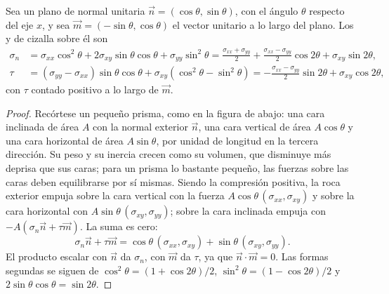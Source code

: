 \begin{proposition}\label{prop:b1:stress-strain-rheology:transformation}
Sea un plano de normal unitaria $\vec n = (\cos\theta, \sin\theta)$, con el ángulo $\theta$ respecto del eje $x$, y sea $\vec m = (-\sin\theta, \cos\theta)$ el vector
unitario a lo largo del plano. Los  y de cizalla sobre él son
\begin{align*}
  \sigma_n &= \sigma_{xx}\cos^2\theta + 2\sigma_{xy}\sin\theta\cos\theta + \sigma_{yy}\sin^2\theta
           = \frac{\sigma_{xx}+\sigma_{yy}}{2} + \frac{\sigma_{xx}-\sigma_{yy}}{2}\cos2\theta + \sigma_{xy}\sin2\theta, \\
  \tau     &= (\sigma_{yy}-\sigma_{xx})\sin\theta\cos\theta + \sigma_{xy}(\cos^2\theta - \sin^2\theta)
           = -\frac{\sigma_{xx}-\sigma_{yy}}{2}\sin2\theta + \sigma_{xy}\cos2\theta ,
\end{align*}
con $\tau$ contado positivo a lo largo de $\vec m$.
\end{proposition}

\begin{proof}
Recórtese un pequeño prisma, como en la figura de abajo: una cara inclinada de área $A$ con la normal exterior $\vec n$, una cara vertical de área
$A\cos\theta$ y una cara horizontal de área $A\sin\theta$, por unidad de longitud en la tercera dirección. Su peso y su inercia crecen como su volumen,
que disminuye más deprisa que sus caras; para un prisma lo bastante pequeño, las fuerzas sobre las caras deben equilibrarse por sí mismas. Siendo la
compresión positiva, la roca exterior empuja sobre la cara vertical con la fuerza
$A\cos\theta\,(\sigma_{xx}, \sigma_{xy})$ y sobre la cara horizontal con
$A\sin\theta\,(\sigma_{xy}, \sigma_{yy})$; sobre la cara inclinada empuja con $-A(\sigma_n\vec n + \tau\vec m)$. La suma es cero:
\[
  \sigma_n\vec n + \tau\vec m = \cos\theta\,(\sigma_{xx}, \sigma_{xy}) + \sin\theta\,(\sigma_{xy}, \sigma_{yy}) .
\]
El producto escalar con $\vec n$ da $\sigma_n$, con $\vec m$ da $\tau$, ya que $\vec n\cdot\vec m = 0$. Las formas segundas se siguen de
$\cos^2\theta = (1+\cos2\theta)/2$, $\sin^2\theta = (1-\cos2\theta)/2$ y $2\sin\theta\cos\theta = \sin2\theta$.
\end{proof}

